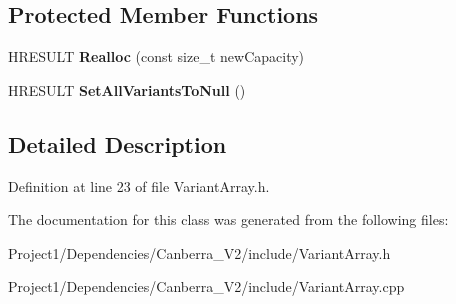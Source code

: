 \subsection*{Protected Member Functions}
\begin{DoxyCompactItemize}
\item 
\mbox{\label{class_canberra_1_1_utility_1_1_core_1_1_variant_array_aa7d7ecc6b183519b30dba568883f82ce}} 
H\+R\+E\+S\+U\+LT {\bfseries Realloc} (const size\+\_\+t new\+Capacity)
\item 
\mbox{\label{class_canberra_1_1_utility_1_1_core_1_1_variant_array_a92a81642564faeeb418f6a2549302971}} 
H\+R\+E\+S\+U\+LT {\bfseries Set\+All\+Variants\+To\+Null} ()
\end{DoxyCompactItemize}


\subsection{Detailed Description}


Definition at line 23 of file Variant\+Array.\+h.



The documentation for this class was generated from the following files\+:\begin{DoxyCompactItemize}
\item 
Project1/\+Dependencies/\+Canberra\+\_\+\+V2/include/Variant\+Array.\+h\item 
Project1/\+Dependencies/\+Canberra\+\_\+\+V2/include/Variant\+Array.\+cpp\end{DoxyCompactItemize}
